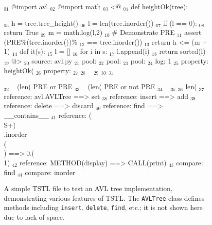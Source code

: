 \documentclass{sig-alternate}
\begin{document}
\begin{figure}
\begin{code}
$_{01}$ @import avl
$_{02}$ @import math
\vspace{0.1in}
$_{03}$ <@
$_{04}$ def heightOk(tree):

$_{05}$     h = tree.tree\_height()
$_{06}$     l = len(tree.inorder())
$_{07}$     if (l == 0):
$_{08}$        return True
$_{09}$     m = math.log(l,2)
$_{10}$     \# Demonstrate PRE
$_{11}$     assert (PRE\%(tree.inorder())\% 
$_{12}$             == tree.inorder())
$_{13}$     return h <= (m + 1)
\vspace{0.1in}
$_{14}$ def it(s):
$_{15}$     l = []
$_{16}$     for i in s:
$_{17}$        l.append(i)
$_{18}$     return sorted(l)
$_{19}$ @>
\vspace{0.1in}
$_{20}$ source: avl.py
\vspace{0.1in}
$_{21}$ pool: %
$_{22}$ pool: %
$_{23}$ pool: %
\vspace{0.1in}
$_{24}$ log: 1 %
\vspace{0.1in}
$_{25}$ property: heightOk(%
$_{26}$ property: %
\vspace{0.1in}
$_{27}$ %
$_{28}$ ~%
$_{29}$ %
\vspace{0.1in}
$_{30}$ %
$_{31}$ %
\vspace{0.1in}

$_{32}$ ~%
   (len(%
      PRE%
   or PRE%
$_{33}$ ~%
   (len(%
      PRE%
   or not PRE%
$_{34}$ ~%
$_{35}$ %
$_{36}$ len(%
\vspace{0.1in}
$_{37}$ reference: avl.AVLTree ==> set
$_{38}$ reference: insert ==> add
$_{39}$ reference: delete ==> discard
$_{40}$ reference: find ==> \_\_contains\_\_
$_{41}$ reference: (\\S+)\\.inorder\\(\\) ==> it(\\1)
$_{42}$ reference: METHOD(display) ==> CALL(print)
\vspace{0.1in}
$_{43}$ compare: find
$_{44}$ compare: inorder
\end{code}
\caption{A simple TSTL file to test an AVL tree implementation,
  demonstrating various features of TSTL.  The {\tt AVLTree} class defines methods including {\tt insert}, {\tt delete}, {\tt find}, etc.; it is not shown here due to lack of space.}
\label{fig:avl}
\end{figure}
\end{document}
